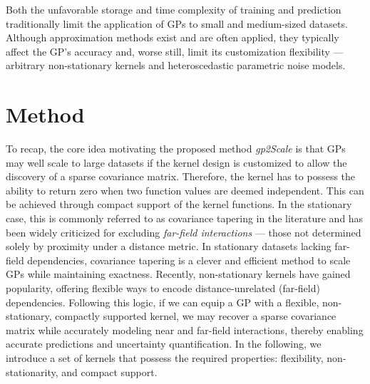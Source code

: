 \documentclass{article}
\begin{document}
Both the unfavorable storage and time complexity of training and prediction traditionally limit the application of GPs to small and medium-sized datasets. Although approximation methods exist and are often applied, they typically affect the GP's accuracy and, worse still, limit its customization flexibility --- arbitrary non-stationary kernels and heteroscedastic parametric noise models.

\section{Method}
To recap, the core idea motivating the proposed method \emph{gp2Scale} is that GPs may well scale to large datasets if the kernel design is customized to allow the discovery of a sparse covariance matrix. Therefore, the kernel has to possess the ability to return zero when two function values are deemed independent. This can be achieved through compact support of the kernel functions. In the stationary case, this is commonly referred to as covariance tapering in the literature \citep{zhang2008covariance, Kaufman2008, Furrer2006} and has been widely criticized for excluding \emph{far-field interactions} --- those not determined solely by proximity under a distance metric. In stationary datasets lacking far-field dependencies, covariance tapering is a clever and efficient method to scale GPs while maintaining exactness. Recently, non-stationary kernels have gained popularity, offering flexible ways to encode distance-unrelated (far-field) dependencies. Following this logic, if we can equip a GP with a flexible, non-stationary, compactly supported kernel, we may recover a sparse covariance matrix while accurately modeling near and far-field interactions, thereby enabling accurate predictions and uncertainty quantification. In the following, we introduce a set of kernels that possess the required properties: flexibility, non-stationarity, and compact support. 
\end{document}
